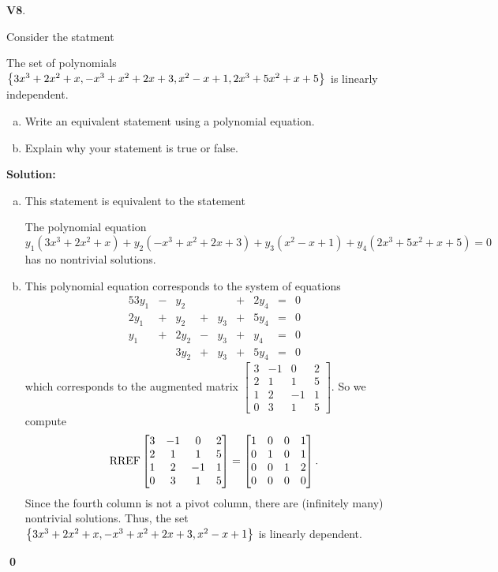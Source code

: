 \documentclass{article}
\newenvironment{problem}[1]
{
  \begin{flushleft}
  \textbf{#1}.
  \ignorespaces
}
{
  \end{flushleft}
}
\newenvironment{solution}
{
  \ignorespaces
  \textbf{Solution:}
}
{
  \ignorespacesafterend
  \begin{flushright}
  {\bfseries \qed}
  \end{flushright}
}
\begin{document}
\begin{problem}{V8}
Consider the statment
\begin{center}\begin{minipage}{0.8\textwidth}
The set of polynomials \(\left\{3x^3+2x^2+x,-x^3+x^2+2x+3,x^2-x+1,2x^3+5x^2+x+5\right\}\) is linearly independent.
\end{minipage}\end{center}
\begin{enumerate}[(a)]
\item Write an equivalent statement using a polynomial equation.
\item Explain why your statement is true or false.
\end{enumerate}
\end{problem}
\begin{solution}
\begin{enumerate}[(a)]
\item This statement is equivalent to the statement
\begin{center}\begin{minipage}{0.8\textwidth}
The polynomial equation \( y_1(3x^3+2x^2+x) + y_2(-x^3+x^2+2x+3)+y_3(x^2-x+1)+y_4(2x^3+5x^2+x+5)=0\) has no nontrivial solutions.
\end{minipage}\end{center}
\item
This polynomial equation corresponds to the system of equations
\begin{alignat*}{5}
3y_1 &-& y_2 & & &+& 2y_4 &=& 0 \\
2y_1 &+& y_2 &+& y_3 &+& 5y_4 &=& 0 \\
 y_1 &+& 2y_2 &-& y_3 &+& y_4 &=& 0 \\
& & 3y_2 &+& y_3 &+& 5y_4 &=& 0 
\end{alignat*}
which corresponds to the augmented matrix \(\begin{bmatrix} 3 & -1 & 0 & 2 \\ 2 & 1 & 1 & 5 \\ 1 & 2 & -1 & 1 \\ 0 & 3 & 1 & 5 \end{bmatrix}\). So we compute
\[\operatorname{RREF} \begin{bmatrix} 3 & -1 & 0 & 2 \\ 2 & 1 & 1 & 5 \\ 1 & 2 & -1 & 1 \\ 0 & 3 & 1 & 5 \end{bmatrix} =
\begin{bmatrix} 1 & 0 & 0 & 1 \\ 0 & 1 & 0 & 1 \\ 0 & 0 & 1 & 2 \\ 0 & 0 & 0 & 0 \end{bmatrix}.\]
Since the fourth column is not a pivot column, there are (infinitely many) nontrivial solutions. Thus, the set \( \left\{3x^3+2x^2+x,-x^3+x^2+2x+3,x^2-x+1\right\}\) is linearly dependent.
\end{enumerate}
\end{solution}
\end{document}
